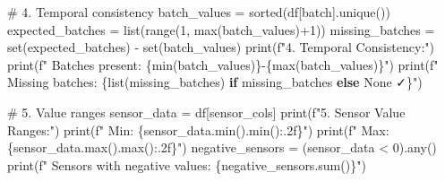 \documentclass[
  letterpaper,
  DIV=11,
  numbers=noendperiod]{scrartcl}
\newenvironment{Shaded}{\begin{snugshade}}{\end{snugshade}}
\newcommand{\BuiltInTok}[1]{\textcolor[rgb]{0.00,0.23,0.31}{#1}}
\newcommand{\CommentTok}[1]{\textcolor[rgb]{0.37,0.37,0.37}{#1}}
\newcommand{\ControlFlowTok}[1]{\textcolor[rgb]{0.00,0.23,0.31}{\textbf{#1}}}
\newcommand{\DecValTok}[1]{\textcolor[rgb]{0.68,0.00,0.00}{#1}}
\newcommand{\NormalTok}[1]{\textcolor[rgb]{0.00,0.23,0.31}{#1}}
\newcommand{\OperatorTok}[1]{\textcolor[rgb]{0.37,0.37,0.37}{#1}}
\newcommand{\SpecialCharTok}[1]{\textcolor[rgb]{0.37,0.37,0.37}{#1}}
\newcommand{\SpecialStringTok}[1]{\textcolor[rgb]{0.13,0.47,0.30}{#1}}
\newcommand{\StringTok}[1]{\textcolor[rgb]{0.13,0.47,0.30}{#1}}
\renewenvironment{Shaded}{%
  \begin{tcolorbox}[%
    enhanced,%
    colback=codebg,%
    colframe=codebg,%
    borderline west={3pt}{0pt}{sectionblue},%
    fontupper=\small\ttfamily,%
    boxrule=0pt,%
    arc=0pt,%
    boxsep=5pt,%
    left=2mm,%
    right=2mm,%
    top=2mm,%
    bottom=2mm%
  ]%
}{%
  \end{tcolorbox}%
}
\begin{document}
\begin{Shaded}
\begin{Highlighting}[]
\CommentTok{\# 4. Temporal consistency}
\NormalTok{batch\_values }\OperatorTok{=} \BuiltInTok{sorted}\NormalTok{(df[}\StringTok{\textquotesingle{}batch\textquotesingle{}}\NormalTok{].unique())}
\NormalTok{expected\_batches }\OperatorTok{=} \BuiltInTok{list}\NormalTok{(}\BuiltInTok{range}\NormalTok{(}\DecValTok{1}\NormalTok{, }\BuiltInTok{max}\NormalTok{(batch\_values)}\OperatorTok{+}\DecValTok{1}\NormalTok{))}
\NormalTok{missing\_batches }\OperatorTok{=} \BuiltInTok{set}\NormalTok{(expected\_batches) }\OperatorTok{{-}} \BuiltInTok{set}\NormalTok{(batch\_values)}
\BuiltInTok{print}\NormalTok{(}\SpecialStringTok{f"4. Temporal Consistency:"}\NormalTok{)}
\BuiltInTok{print}\NormalTok{(}\SpecialStringTok{f"   Batches present: }\SpecialCharTok{\{}\BuiltInTok{min}\NormalTok{(batch\_values)}\SpecialCharTok{\}}\SpecialStringTok{{-}}\SpecialCharTok{\{}\BuiltInTok{max}\NormalTok{(batch\_values)}\SpecialCharTok{\}}\SpecialStringTok{"}\NormalTok{)}
\BuiltInTok{print}\NormalTok{(}\SpecialStringTok{f"   Missing batches: }\SpecialCharTok{\{}\BuiltInTok{list}\NormalTok{(missing\_batches) }\ControlFlowTok{if}\NormalTok{ missing\_batches }\ControlFlowTok{else} \StringTok{\textquotesingle{}None ✓\textquotesingle{}}\SpecialCharTok{\}}\SpecialStringTok{"}\NormalTok{)}

\CommentTok{\# 5. Value ranges}
\NormalTok{sensor\_data }\OperatorTok{=}\NormalTok{ df[sensor\_cols]}
\BuiltInTok{print}\NormalTok{(}\SpecialStringTok{f"5. Sensor Value Ranges:"}\NormalTok{)}
\BuiltInTok{print}\NormalTok{(}\SpecialStringTok{f"   Min: }\SpecialCharTok{\{}\NormalTok{sensor\_data}\SpecialCharTok{.}\BuiltInTok{min}\NormalTok{()}\SpecialCharTok{.}\BuiltInTok{min}\NormalTok{()}\SpecialCharTok{:.2f\}}\SpecialStringTok{"}\NormalTok{)}
\BuiltInTok{print}\NormalTok{(}\SpecialStringTok{f"   Max: }\SpecialCharTok{\{}\NormalTok{sensor\_data}\SpecialCharTok{.}\BuiltInTok{max}\NormalTok{()}\SpecialCharTok{.}\BuiltInTok{max}\NormalTok{()}\SpecialCharTok{:.2f\}}\SpecialStringTok{"}\NormalTok{)}
\NormalTok{negative\_sensors }\OperatorTok{=}\NormalTok{ (sensor\_data }\OperatorTok{\textless{}} \DecValTok{0}\NormalTok{).}\BuiltInTok{any}\NormalTok{()}
\BuiltInTok{print}\NormalTok{(}\SpecialStringTok{f"   Sensors with negative values: }\SpecialCharTok{\{}\NormalTok{negative\_sensors}\SpecialCharTok{.}\BuiltInTok{sum}\NormalTok{()}\SpecialCharTok{\}}\SpecialStringTok{"}\NormalTok{)}


\end{Highlighting}
\end{Shaded}
\end{document}
